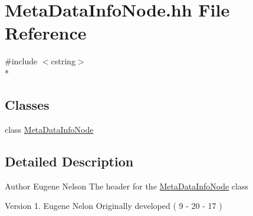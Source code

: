 \hypertarget{_meta_data_info_node_8hh}{\section{Meta\-Data\-Info\-Node.\-hh File Reference}
\label{_meta_data_info_node_8hh}
}
{\ttfamily \#include $<$cstring$>$}\\*
\subsection*{Classes}
\begin{DoxyCompactItemize}
\item 
class \hyperlink{class_meta_data_info_node}{Meta\-Data\-Info\-Node}
\end{DoxyCompactItemize}


\subsection{Detailed Description}
\begin{DoxyAuthor}{Author}
Eugene Nelson  The header for the \hyperlink{class_meta_data_info_node}{Meta\-Data\-Info\-Node} class 
\end{DoxyAuthor}
\begin{DoxyVersion}{Version}
1. Eugene Nelon Originally developed ( 9 -\/ 20 -\/ 17 ) 
\end{DoxyVersion}
